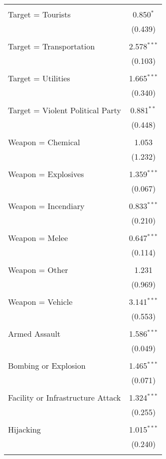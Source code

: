 \begin{table}[!htbp]
\begin{tabular}{@{\extracolsep{0.1pt}}lc}
  & \\ 
 Target = Tourists & 0.850$^{*}$ \\ 
  & (0.439) \\ 
  & \\ 
 Target = Transportation & 2.578$^{***}$ \\ 
  & (0.103) \\ 
  & \\ 
 Target = Utilities & 1.665$^{***}$ \\ 
  & (0.340) \\ 
  & \\ 
 Target = Violent Political Party & 0.881$^{**}$ \\ 
  & (0.448) \\ 
  & \\ 
 Weapon = Chemical & 1.053 \\ 
  & (1.232) \\ 
  & \\ 
 Weapon = Explosives & 1.359$^{***}$ \\ 
  & (0.067) \\ 
  & \\ 
 Weapon = Incendiary & 0.833$^{***}$ \\ 
  & (0.210) \\ 
  & \\ 
 Weapon = Melee & 0.647$^{***}$ \\ 
  & (0.114) \\ 
  & \\ 
 Weapon = Other & 1.231 \\ 
  & (0.969) \\ 
  & \\ 
 Weapon = Vehicle & 3.141$^{***}$ \\ 
  & (0.553) \\ 
  & \\ 
 Armed Assault & 1.586$^{***}$ \\ 
  & (0.049) \\ 
  & \\ 
 Bombing or Explosion & 1.465$^{***}$ \\ 
  & (0.071) \\ 
  & \\ 
 Facility or Infrastructure Attack & 1.324$^{***}$ \\ 
  & (0.255) \\ 
  & \\ 
 Hijacking & 1.015$^{***}$ \\ 
  & (0.240) \\ 
  & \\ 

\end{tabular}
\end{table}
